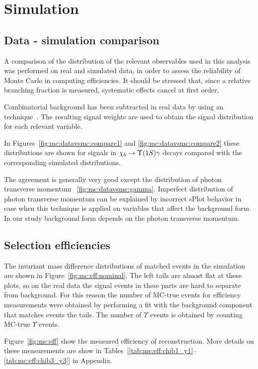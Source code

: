 \section{Simulation}
\label{sec:mc}

\subsection{Data - simulation comparison}
\label{sec:mc:datavsmc}

A comparison of the distribution of the relevant observables used in this
analysis was performed on real and simulated data, in order to assess the
reliability of Monte Carlo in computing efficiencies. It should be stressed
that, since a relative branching fraction is measured, systematic effects cancel
at first order.

Combinatorial background has been subtracted in real data by using an
\sPlot  technique~\cite{Pivk:2004ty}.
The resulting signal weights are used to obtain the signal distribution for each
relevant variable. 


In Figures~\ref{fig:mc:datavsmc:compare1} and \ref{fig:mc:datavsmc:compare2}
these distributions  are shown for signals in $\chib \to \Y1S \gamma$ decays
compared with the corresponding simulated distributions.

The agreement is generally very good except the distribution of photon
transverse momentum ~\ref{fig:mc:datavsmc:gamma}. Imperfect  distribution of
photon transverse momentum can be explained by incorrect sPlot behavior in case
when this technique is applied on variables that affect the background form. In
our study background form depends on the photon transverse momentum.



\subsection{Selection efficiencies}
\label{sec:mc:eff}

The invariant mass difference distributions of matched events in the \chib
simulation are shown in Figure~\ref{fig:mc:eff:nominal}. The left tails are
almost flat at these plots, so on the real data the signal events in these parts
are hard to separate from background. For this reason the number of MC-true
\chib events for efficiency measurements were obtained by performing a fit with
the background component that matches events the tails. The number of $\Upsilon$
events is obtained by counting MC-true $\Upsilon$ events.



Figure~\ref{fig:mc:eff} show the measured efficiency of \chib reconstruction.
More details on these measurements are show in
Tables~[\ref{tab:mc:eff:chib1_y1}--\ref{tab:mc:eff:chib3_y3}] in Appendix.



